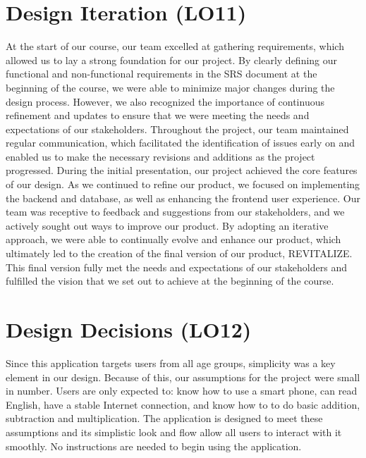 \documentclass{article}
\begin{document}
\section{Design Iteration (LO11)}

At the start of our course, our team excelled at gathering requirements, which allowed us to lay a strong foundation for our project. By clearly defining our functional and non-functional requirements in the SRS document at the beginning of the course, we were able to minimize major changes during the design process. However, we also recognized the importance of continuous refinement and updates to ensure that we were meeting the needs and expectations of our stakeholders. Throughout the project, our team maintained regular communication, which facilitated the identification of issues early on and enabled us to make the necessary revisions and additions as the project progressed. During the initial presentation, our project achieved the core features of our design. As we continued to refine our product, we focused on implementing the backend and database, as well as enhancing the frontend user experience. Our team was receptive to feedback and suggestions from our stakeholders, and we actively sought out ways to improve our product. By adopting an iterative approach, we were able to continually evolve and enhance our product, which ultimately led to the creation of the final version of our product, REVITALIZE. This final version fully met the needs and expectations of our stakeholders and fulfilled the vision that we set out to achieve at the beginning of the course.

\section{Design Decisions (LO12)}
Since this application targets users from all age groups, simplicity was a key element in our design. Because of this, our assumptions for the project were small in number. Users are only expected to: know how to use a smart phone, can read English, have a stable Internet connection, and know how to to do basic addition, subtraction and multiplication. The application is designed to meet these assumptions and its simplistic look and flow allow all users to interact with it smoothly. No instructions are needed to begin using the application. 
\end{document}
